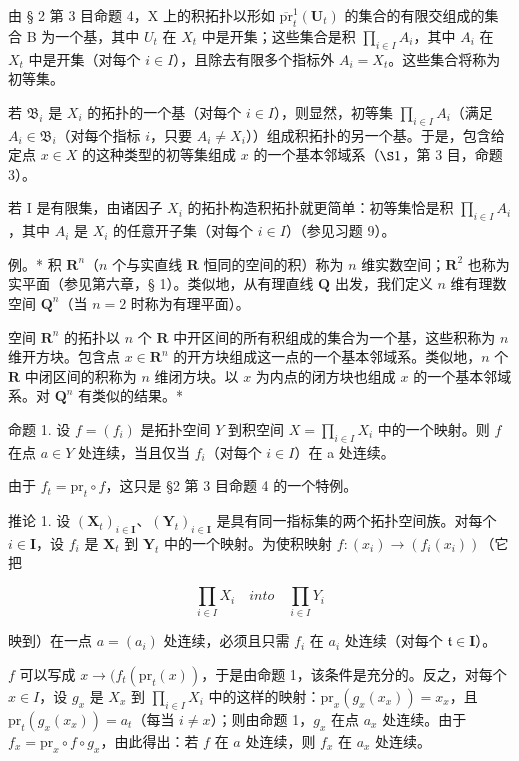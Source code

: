 由 § 2 第 3 目命题 4，X 上的积拓扑以形如 \(\overline{\mathrm{pr}}_{t}^{1}(\mathbf{U}_{t})\) 的集合的有限交组成的集合 B 为一个基，其中 \(U_{t}\) 在 \(X_{t}\) 中是开集；这些集合是积 \(\prod_{i\in I}A_{i}\)，其中 \(A_{i}\) 在 \(X_{t}\) 中是开集（对每个 \(i\in I\)），且除去有限多个指标外 \(A_{i}=X_{t}\)。这些集合将称为初等集。

若 \(\mathfrak{B}_i\) 是 \(X_i\) 的拓扑的一个基（对每个 \(i \in I\)），则显然，初等集 \(\prod_{i \in I} A_i\)（满足 \(A_i \in \mathfrak{B}_i\)（对每个指标 \(i\)，只要 \(A_i \neq X_i\)））组成积拓扑的另一个基。于是，包含给定点 \(x \in X\) 的这种类型的初等集组成 \(x\) 的一个基本邻域系（\(\S 1\)，第 3 目，命题 3）。

若 I 是有限集，由诸因子 \(X_{i}\) 的拓扑构造积拓扑就更简单：初等集恰是积 \(\prod_{i\in I}A_{i}\)，其中 \(A_{i}\) 是 \(X_{i}\) 的任意开子集（对每个 \(i\in I\)）（参见习题 9）。

例。* 积 \(\mathbf{R}^n\)（\(n\) 个与实直线 \(\mathbf{R}\) 恒同的空间的积）称为 \(n\) 维实数空间；\(\mathbf{R}^2\) 也称为实平面（参见第六章，§ 1）。类似地，从有理直线 \(\mathbf{Q}\) 出发，我们定义 \(n\) 维有理数空间 \(\mathbf{Q}^n\)（当 \(n = 2\) 时称为有理平面）。

空间 \(\mathbf{R}^n\) 的拓扑以 \(n\) 个 \(\mathbf{R}\) 中开区间的所有积组成的集合为一个基，这些积称为 \(n\) 维开方块。包含点 \(x \in \mathbf{R}^n\) 的开方块组成这一点的一个基本邻域系。类似地，\(n\) 个 \(\mathbf{R}\) 中闭区间的积称为 \(n\) 维闭方块。以 \(x\) 为内点的闭方块也组成 \(x\) 的一个基本邻域系。对 \(\mathbf{Q}^n\) 有类似的结果。*

命题 1. 设 \(f = (f_{i})\) 是拓扑空间 \(Y\) 到积空间 \(X = \prod_{i \in I} X_{i}\) 中的一个映射。则 \(f\) 在点 \(a \in Y\) 处连续，当且仅当 \(f_{i}\)（对每个 \(i \in I\)）在 a 处连续。

由于 \(f_{t} = \mathrm{pr}_{t} \circ f\)，这只是 §2 第 3 目命题 4 的一个特例。

推论 1. 设 \((\mathbf{X}_t)_{i \in \mathbf{I}}\)、\((\mathbf{Y}_t)_{i \in \mathbf{I}}\) 是具有同一指标集的两个拓扑空间族。对每个 \(i \in \mathbf{I}\)，设 \(f_i\) 是 \(\mathbf{X}_t\) 到 \(\mathbf{Y}_t\) 中的一个映射。为使积映射 \(f: (x_i) \to (f_i(x_i))\)（它把

\[
\prod_ {i \in I} X _ {i} \quad i n t o \quad \prod_ {i \in I} Y _ {i}
\]

映到）在一点 \(a = (a_{i})\) 处连续，必须且只需 \(f_{i}\) 在 \(a_{i}\) 处连续（对每个 \(\mathfrak{t} \in \mathbf{I}\)）。

\(f\) 可以写成 \(x \to (f_{t}(\mathrm{pr}_{t}(x))\)，于是由命题 1，该条件是充分的。反之，对每个 \(x \in I\)，设 \(g_{x}\) 是 \(X_{x}\) 到 \(\prod_{i \in I} X_{i}\) 中的这样的映射：\(\mathrm{pr}_{x}(g_{x}(x_{x})) = x_{x}\)，且 \(\mathrm{pr}_{t}(g_{x}(x_{x})) = a_{t}\)（每当 \(i \neq x\)）；则由命题 1，\(g_{x}\) 在点 \(a_{x}\) 处连续。由于 \(f_{x} = \mathrm{pr}_{x} \circ f \circ g_{x}\)，由此得出：若 \(f\) 在 \(a\) 处连续，则 \(f_{x}\) 在 \(a_{x}\) 处连续。

